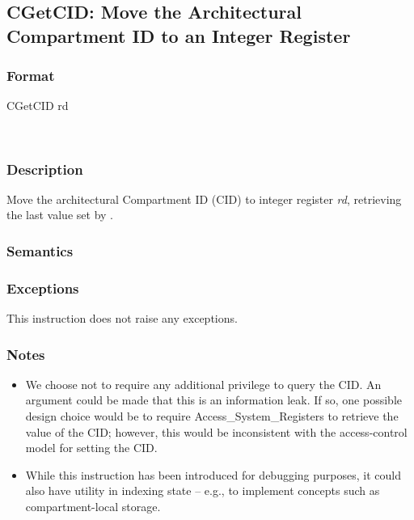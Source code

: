 \clearpage
{}
{}
\subsection*{CGetCID: Move the Architectural Compartment ID to an Integer
  Register}

\subsubsection*{Format}

CGetCID rd

%
\begin{center}
\\
\end{center}

\subsubsection*{Description}

Move the architectural Compartment ID (CID) to integer register \emph{rd},
retrieving the last value set by .

\subsubsection*{Semantics}


\subsubsection*{Exceptions}

This instruction does not raise any exceptions.

\subsubsection*{Notes}

\begin{itemize}
\item
  We choose not to require any additional privilege to query the CID.
  An argument could be made that this is an information leak.
  If so, one possible design choice would be to require
  Access\_System\_Registers to retrieve the value of the CID; however, this
  would be inconsistent with the access-control model for setting the CID.
\item
  While this instruction has been introduced for debugging purposes, it could
  also have utility in indexing state -- e.g., to implement concepts such as
  compartment-local storage.
\end{itemize}
